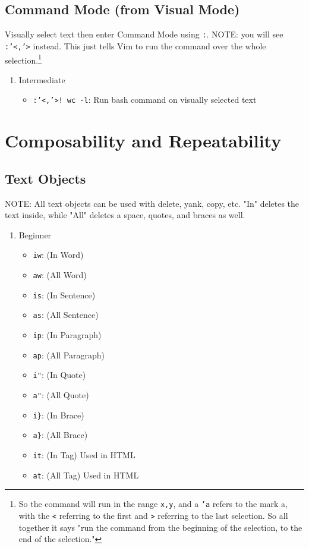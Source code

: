 \documentclass[11pt]{article}
\begin{document}
\subsection{Command Mode (from Visual Mode)}
\label{sec:orgd631605}
Visually select text then enter Command Mode using \texttt{:}. NOTE: you will see
\texttt{:'<,'>} instead. This just tells Vim to run the command over the whole
selection.\footnote{So the command will run in the range \texttt{x,y}, and 
a \texttt{'a} refers to the mark a, with the \texttt{<} referring to the first and \texttt{>}
referring to the last selection. So all together it says "run the command from
the beginning of the selection, to the end of the selection."}
\begin{enumerate}
\item Intermediate
\label{sec:org908b754}
\begin{itemize}
\item \texttt{:'<,'>! wc -l}: Run bash command on visually selected text
\end{itemize}
\end{enumerate}
\section{Composability and Repeatability}
\label{sec:org6d0d312}
\subsection{Text Objects}
\label{sec:org613225c}
NOTE: All text objects can be used with delete, yank, copy, etc. "In" deletes
the text inside, while "All" deletes a space, quotes, and braces as well.
\begin{enumerate}
\item Beginner
\label{sec:org88aea38}
\begin{itemize}
\item \texttt{iw}: (In Word)
\item \texttt{aw}: (All Word)
\item \texttt{is}: (In Sentence)
\item \texttt{as}: (All Sentence)
\item \texttt{ip}: (In Paragraph)
\item \texttt{ap}: (All Paragraph)
\item \texttt{i"}: (In Quote)
\item \texttt{a"}: (All Quote)
\item \texttt{i\}}: (In Brace)
\item \texttt{a\}}: (All Brace)
\item \texttt{it}: (In Tag) Used in HTML
\item \texttt{at}: (All Tag) Used in HTML
\end{itemize}
\end{enumerate}
\end{document}
